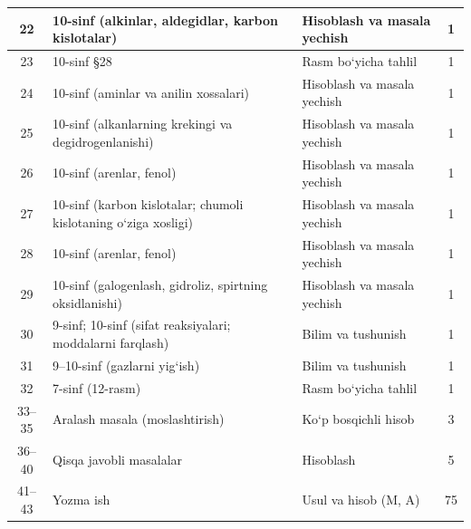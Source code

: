\documentclass[11pt,a4paper]{article}
\begin{document}
{\begin{longtable}{|c|p{7.2cm}|p{5.4cm}|c|}
22 & 10-sinf (alkinlar, aldegidlar, karbon kislotalar) & Hisoblash va masala yechish & 1\\\hline
23 & 10-sinf \S{}28 & Rasm bo`yicha tahlil & 1\\\hline
24 & 10-sinf (aminlar va anilin xossalari) & Hisoblash va masala yechish & 1\\\hline
25 & 10-sinf (alkanlarning krekingi va degidrogenlanishi) & Hisoblash va masala yechish & 1\\\hline
26 & 10-sinf (arenlar, fenol) & Hisoblash va masala yechish & 1\\\hline
27 & 10-sinf (karbon kislotalar; chumoli kislotaning o`ziga xosligi) & Hisoblash va masala yechish & 1\\\hline
28 & 10-sinf (arenlar, fenol) & Hisoblash va masala yechish & 1\\\hline
29 & 10-sinf (galogenlash, gidroliz, spirtning oksidlanishi) & Hisoblash va masala yechish & 1\\\hline
30 & 9-sinf; 10-sinf (sifat reaksiyalari; moddalarni farqlash) & Bilim va tushunish & 1\\\hline
31 & 9--10-sinf (gazlarni yig`ish) & Bilim va tushunish & 1\\\hline
32 & 7-sinf (12-rasm) & Rasm bo`yicha tahlil & 1\\\hline
33--35 & Aralash masala (moslashtirish) & Ko`p bosqichli hisob & 3\\\hline
36--40 & Qisqa javobli masalalar & Hisoblash & 5\\\hline
41--43 & Yozma ish & Usul va hisob (M, A) & 75\\\hline
\end{longtable}}
\end{document}
